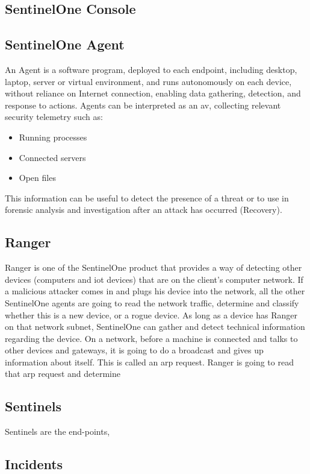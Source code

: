 \begin{multicols}{2}
      \subsection{SentinelOne Console}

      \subsection{SentinelOne Agent}
      An Agent is a software program, deployed to each endpoint, including desktop, laptop, server or virtual environment,
      and runs autonomously on each device, without reliance on Internet connection, enabling data gathering, detection, and
      response to actions. Agents can be interpreted as an \acrshort{av}, collecting relevant security telemetry such as:
      \begin{itemize}
            \item Running processes
            \item Connected servers
            \item Open files
      \end{itemize}
      This information can be useful to detect the presence of a threat or to use in forensic analysis and investigation after
      an attack has occurred (Recovery).
      \subsection{Ranger}
      Ranger is one of the SentinelOne product that provides a way of detecting other devices (computers and
      \acrshort{iot} devices) that are on the client's computer network. If a malicious attacker comes in and plugs his device
      into the network, all the other SentinelOne agents are going to read the network traffic, determine and classify whether
      this is a new device, or a rogue device. As long as a device has Ranger on that network subnet, SentinelOne can gather and
      detect technical information regarding the device. On a network, before a machine is connected and talks to other devices
      and gateways, it is going to do a broadcast and gives up information about itself. This is called an \acrshort{arp} request.
      Ranger is going to read that \acrshort{arp} request and determine
      \subsection{Sentinels}
      Sentinels are the end-points,

      \subsection{Incidents}


\end{multicols}
